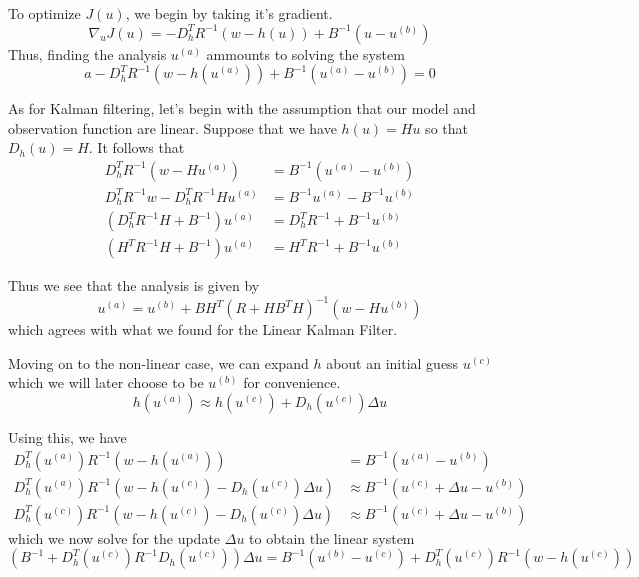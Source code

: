 To optimize $J(u)$, we begin by taking it's gradient.
\begin{equation}
    \nabla_uJ(u) = -D_h^TR^{-1}(w-h(u)) + B^{-1}(u-u^{(b)})
\end{equation}
Thus, finding the analysis $u^{(a)}$ ammounts to solving the system
\begin{equation}
    a-D_h^TR^{-1}(w-h(u^{(a)})) + B^{-1}(u^{(a)}-u^{(b)}) = 0
\end{equation}

As for Kalman filtering, let's begin with the assumption that our model and observation function are linear. Suppose that we have $h(u) = Hu$ so that $D_h(u) = H$. It follows that
\begin{align}
  D_h^TR^{-1}(w-Hu^{(a)}) &= B^{-1}(u^{(a)}-u^{(b)}) \\
  D_h^TR^{-1}w - D_h^TR^{-1}Hu^{(a)} &= B^{-1}u^{(a)} - B^{-1}u^{(b)} \\
  \left(D_h^TR^{-1}H + B^{-1} \right)u^{(a)} &= D_h^TR^{-1} + B^{-1}u^{(b)} \\
  \left(H^TR^{-1}H + B^{-1} \right)u^{(a)} &= H^TR^{-1} + B^{-1}u^{(b)}
\end{align}

Thus we see that the analysis is given by
\begin{equation}
  u^{(a)} = u^{(b)} + BH^T\left( R + HB^TH \right)^{-1}(w-Hu^{(b)})
\end{equation}
which agrees with what we found for the Linear Kalman Filter.


Moving on to the non-linear case, we can expand $h$ about an initial guess $u^{(c)}$ which we will later choose to be $u^{(b)}$ for convenience.
\begin{equation}
    h(u^{(a)}) \approx h(u^{(c)}) + D_h(u^{(c)})\Delta u
\end{equation}

Using this, we have
\begin{align}
    D_h^T(u^{(a)})R^{-1}(w-h(u^{(a)})) &= B^{-1}(u^{(a)} - u^{(b)}) \\
    D_h^T(u^{(a)})R^{-1}(w-h(u^{(c)})-D_h(u^{(c)})\Delta u) &\approx B^{-1}(u^{(c)} + \Delta u - u^{(b)}) \\
    D_h^T(u^{(c)})R^{-1}(w-h(u^{(c)})-D_h(u^{(c)})\Delta u) &\approx B^{-1}(u^{(c)} + \Delta u - u^{(b)})
\end{align}
which we now solve for the update $\Delta u$ to obtain the linear system
\begin{equation}
    \left(B^{-1} + D_h^T(u^{(c)})R^{-1}D_h(u^{(c)}) \right)\Delta u = B^{-1}(u^{(b)}-u^{(c)}) + D_h^T(u^{(c)})R^{-1}(w-h(u^{(c)}))
\end{equation}

